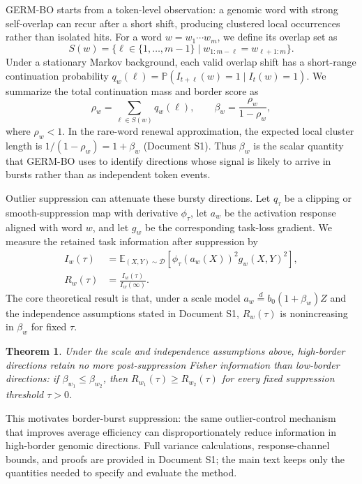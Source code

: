 \documentclass[12pt,letterpaper]{article}
\newtheorem{theorem}{Theorem}
\begin{document}
GERM-BO starts from a token-level observation: a genomic word with strong self-overlap can recur after a short shift, producing clustered local occurrences rather than isolated hits. For a word $w=w_1\cdots w_m$, we define its overlap set as
\begin{equation}
S(w) = \{\ell \in \{1,\ldots,m-1\} \mid w_{1:m-\ell} = w_{\ell+1:m}\}.
\label{eq:overlapset}
\end{equation}
Under a stationary Markov background, each valid overlap shift has a short-range continuation probability $q_w(\ell)=\mathbb{P}(I_{t+\ell}(w)=1\mid I_t(w)=1)$. We summarize the total continuation mass and border score as
\begin{equation}
\rho_w = \sum_{\ell \in S(w)} q_w(\ell),
\qquad
\beta_w = \frac{\rho_w}{1-\rho_w},
\label{eq:beta}
\end{equation}
where $\rho_w<1$. In the rare-word renewal approximation, the expected local cluster length is $1/(1-\rho_w)=1+\beta_w$ (Document S1). Thus $\beta_w$ is the scalar quantity that GERM-BO uses to identify directions whose signal is likely to arrive in bursts rather than as independent token events.

Outlier suppression can attenuate these bursty directions. Let $q_{\tau}$ be a clipping or smooth-suppression map with derivative $\phi_{\tau}$, let $a_w$ be the activation response aligned with word $w$, and let $g_w$ be the corresponding task-loss gradient. We measure the retained task information after suppression by
\begin{align}
I_w(\tau) &= \mathbb{E}_{(X,Y)\sim \mathcal{D}}\!\left[\phi_{\tau}(a_w(X))^2 g_w(X,Y)^2\right], \label{eq:fisherretained}\\
R_w(\tau) &= \frac{I_w(\tau)}{I_w(\infty)}. \label{eq:retention}
\end{align}
The core theoretical result is that, under a scale model $a_w\overset{d}{=}b_0(1+\beta_w)Z$ and the independence assumptions stated in Document S1, $R_w(\tau)$ is nonincreasing in $\beta_w$ for fixed $\tau$.
\begin{theorem}\label{thm:fisher}
Under the scale and independence assumptions above, high-border directions retain no more post-suppression Fisher information than low-border directions: if $\beta_{w_1}\leq\beta_{w_2}$, then $R_{w_1}(\tau)\geq R_{w_2}(\tau)$ for every fixed suppression threshold $\tau>0$.
\end{theorem}
This motivates border-burst suppression: the same outlier-control mechanism that improves average efficiency can disproportionately reduce information in high-border genomic directions. Full variance calculations, response-channel bounds, and proofs are provided in Document S1; the main text keeps only the quantities needed to specify and evaluate the method.
\end{document}
